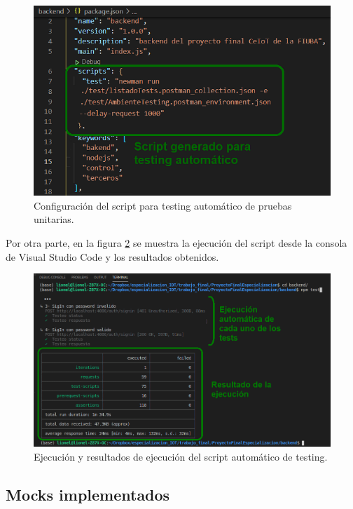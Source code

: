 \begin{figure}[ht]
	\centering
	\includegraphics[width=1\textwidth]{./Figures/scriptNewman.png}
	\caption{Configuración del script para testing automático de pruebas unitarias.}
	\label{fig:scriptNewman}
\end{figure}

Por otra parte, en la figura \ref{fig:newmanEjecucion} se muestra la ejecución del script desde la consola de Visual Studio Code y los resultados obtenidos. 


\begin{figure}[ht]
	\centering
	\includegraphics[width=1\textwidth]{./Figures/newmanEjecucion.png}
	\caption{Ejecución y resultados de ejecución del script automático de testing.}
	\label{fig:newmanEjecucion}
\end{figure}


\subsection{Mocks implementados}

